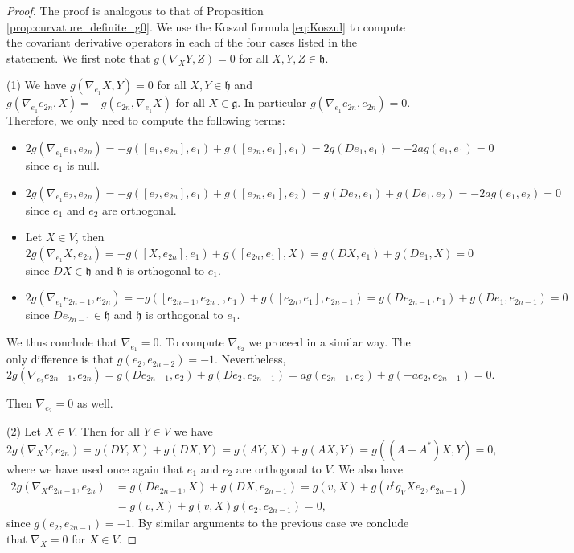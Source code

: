 \documentclass{article}
\theoremstyle{definition}
\newcommand{\frg}{\mathfrak{g}}
\newcommand{\frh}{\mathfrak{h}}
\begin{document}
\begin{proof}
    The proof is analogous to that of Proposition \ref{prop:curvature_definite_g0}. We use the Koszul formula \eqref{eq:Koszul} to compute the covariant derivative operators in each of the four cases listed in the statement. We first note that $g(\nabla_XY,Z)=0$ for all $X,Y,Z\in\frh$.\medskip

    (1) We have $g(\nabla_{e_1}X,Y)=0$ for all $X,Y\in\frh$ and $g(\nabla_{e_1}e_{2n},X)=-g(e_{2n},\nabla_{e_1}X)$ for all $X\in\frg$. In particular $g(\nabla_{e_1}e_{2n},e_{2n})=0$. Therefore, we only need to compute the following terms: \begin{itemize}
        \item $2g(\nabla_{e_1}e_1,e_{2n})=-g([e_1,e_{2n}],e_1)+g([e_{2n},e_1],e_1)=2g(De_1,e_1)=-2ag(e_1,e_1)=0$ since $e_1$ is null.
        \item $2g(\nabla_{e_1}e_2,e_{2n})=-g([e_2,e_{2n}],e_1)+g([e_{2n},e_1],e_2)=g(De_2,e_1)+g(De_1,e_2)=-2ag(e_1,e_2)=0$ since $e_1$ and $e_2$ are orthogonal.
        \item Let $X\in V$, then $2g(\nabla_{e_1}X,e_{2n})=-g([X,e_{2n}],e_1)+g([e_{2n},e_1],X)=g(DX,e_1)+g(De_1,X)=0$ since $DX\in\frh$ and $\frh$ is orthogonal to $e_1$.
        \item $2g(\nabla_{e_1}e_{2n-1},e_{2n})=-g([e_{2n-1},e_{2n}],e_1)+g([e_{2n},e_1],e_{2n-1})=g(De_{2n-1},e_1)+g(De_1,e_{2n-1})=0$ since $De_{2n-1}\in\frh$ and $\frh$ is orthogonal to $e_1$.
    \end{itemize}

    We thus conclude that $\nabla_{e_1}=0$. To compute $\nabla_{e_2}$ we proceed in a similar way. The only difference is that $g(e_2,e_{2n-2})=-1$. Nevertheless, $$2g(\nabla_{e_2}e_{2n-1},e_{2n})=g(De_{2n-1},e_2)+g(De_2,e_{2n-1})=ag(e_{2n-1},e_2)+g(-ae_2,e_{2n-1})=0.$$

    Then $\nabla_{e_2}=0$ as well.\medskip

    (2) Let $X\in V$. Then for all $Y\in V$ we have $$2g(\nabla_XY,e_{2n})=g(DY,X)+g(DX,Y)=g(AY,X)+g(AX,Y)=g((A+A^*)X,Y)=0,$$ where we have used once again that $e_1$ and $e_2$ are orthogonal to $V$. We also have \begin{align*}
        2g(\nabla_Xe_{2n-1},e_{2n})&=g(De_{2n-1},X)+g(DX,e_{2n-1})=g(v,X)+g(v^tg_VXe_2,e_{2n-1})\\
        &=g(v,X)+g(v,X)g(e_2,e_{2n-1})=0,
    \end{align*} since $g(e_2,e_{2n-1})=-1$. By similar arguments to the previous case we conclude that $\nabla_X=0$ for $X\in V$.\medskip


\end{proof}
\end{document}
